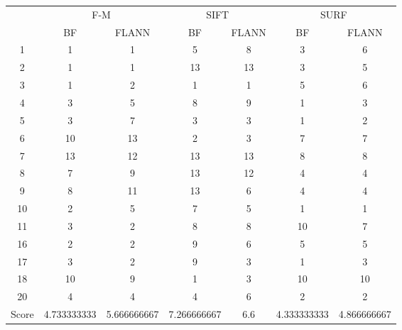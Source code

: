 \documentclass[draft,final]{vutinfth} %
\begin{document}
\begin{minipage}{\linewidth}
\centering
\begin{tabular}{ccccccc}
\multirow{2}{*}{ } & \multicolumn{2}{c}{ F-M } & \multicolumn{2}{c}{ SIFT } & \multicolumn{2}{c}{ SURF } \\
& BF & FLANN & BF & FLANN & BF & FLANN \\
1 & 1 & 1 & 5 & 8 & 3 & 6 \\
2 & 1 & 1 & 13 & 13 & 3 & 5 \\
3 & 1 & 2 & 1 & 1 & 5 & 6 \\
4 & 3 & 5 & 8 & 9 & 1 & 3 \\
5 & 3 & 7 & 3 & 3 & 1 & 2 \\
6 & 10 & 13 & 2 & 3 & 7 & 7 \\
7 & 13 & 12 & 13 & 13 & 8 & 8 \\
8 & 7 & 9 & 13 & 12 & 4 & 4 \\
9 & 8 & 11 & 13 & 6 & 4 & 4 \\
10 & 2 & 5 & 7 & 5 & 1 & 1 \\
11 & 3 & 2 & 8 & 8 & 10 & 7 \\
16 & 2 & 2 & 9 & 6 & 5 & 5 \\
17 & 3 & 2 & 9 & 3 & 1 & 3 \\
18 & 10 & 9 & 1 & 3 & 10 & 10 \\
20 & 4 & 4 & 4 & 6 & 2 & 2 \\
Score & 4.733333333 & 5.666666667 & 7.266666667 & 6.6 & 4.333333333 & 4.866666667 \\
\end{tabular}

 \label{tab:20Mean} 
\end{minipage}
\end{document}
